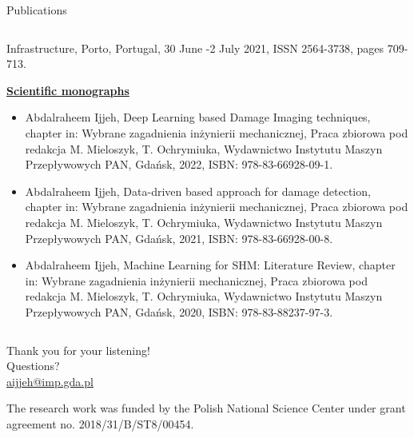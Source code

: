 \documentclass[10pt,aspectratio=169,dvipsnames]{beamer} %
\begin{document}
\begin{frame}{Publications}
\begin{tiny}
\begin{columns}[T]
\begin{column}[t]{0.48\textwidth}
\begin{itemize}
						Infrastructure, Porto, Portugal, 30 June -2 July 2021, ISSN 2564-3738, pages 709-713.
					\end{itemize}		
					\underline{\textbf{Scientific monographs}}					
					\begin{itemize}
						\item {Abdalraheem Ijjeh}, Deep Learning based Damage Imaging techniques, chapter in: Wybrane zagadnienia
						inżynierii mechanicznej, Praca zbiorowa pod redakcja M. Mieloszyk, T. Ochrymiuka, Wydawnictwo Instytutu
						Maszyn Przepływowych PAN, Gdańsk, 2022, ISBN: 978-83-66928-09-1.
						\item {Abdalraheem Ijjeh}, Data-driven based approach for damage detection, chapter in: Wybrane zagadnienia
						inżynierii mechanicznej, Praca zbiorowa pod redakcja M. Mieloszyk, T. Ochrymiuka, Wydawnictwo Instytutu
						Maszyn Przepływowych PAN, Gdańsk, 2021, ISBN: 978-83-66928-00-8.				
						\item {Abdalraheem Ijjeh}, Machine Learning for SHM: Literature Review, chapter in: Wybrane zagadnienia
						inżynierii mechanicznej, Praca zbiorowa pod redakcja M. Mieloszyk, T. Ochrymiuka, Wydawnictwo Instytutu
						Maszyn Przepływowych PAN, Gdańsk, 2020, ISBN: 978-83-88237-97-3.
					\end{itemize}
				\end{column}		
			\end{columns}
		\end{tiny}
	\end{frame}	
	
	{
		\begin{frame}[standout]
			Thank you for your listening!\\ \vspace{12pt}
			Questions?\\ \vspace{12pt}
			\url{aijjeh@imp.gda.pl}
			\par\medskip
			\par\medskip
			\footnotesize
			The research work was funded by the Polish National Science Center under grant agreement no. 2018/31/B/ST8/00454.
		\end{frame}
	}
\end{document}
